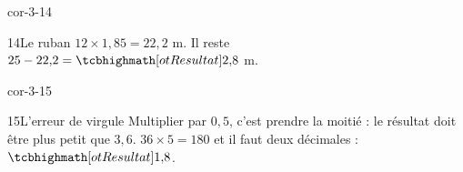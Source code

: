\begin{blocLivre}{cor-3-14}\begin{corrige}{14}{Le ruban}
$12\times1{,}85=22{,}2$ m. Il reste $25-22{,}2=\res{2{,}8}$ m.
\end{corrige}\end{blocLivre}
\begin{blocLivre}{cor-3-15}\begin{corrige}{15}{L’erreur de virgule}
Multiplier par $0{,}5$, c’est prendre la moitié : le résultat doit être plus petit que $3{,}6$. $36\times5=180$ et il faut deux décimales : $\res{1{,}8}$.
\end{corrige}\end{blocLivre}

